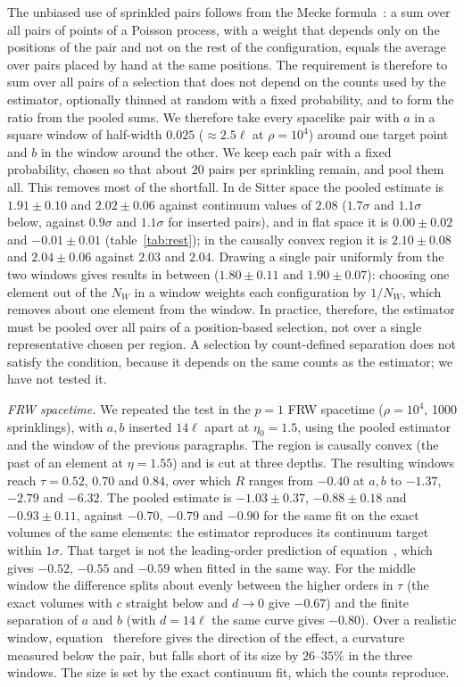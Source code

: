 \documentclass[12pt]{iopart}
\begin{document}
The unbiased use of sprinkled pairs follows from the Mecke formula~\cite{LastPenrose17}: a sum over all pairs of points of a Poisson process, with a weight that depends only on the positions of the pair and not on the rest of the configuration, equals the average over pairs placed by hand at the same positions. The requirement is therefore to sum over all pairs of a selection that does not depend on the counts used by the estimator, optionally thinned at random with a fixed probability, and to form the ratio from the pooled sums. We therefore take every spacelike pair with $a$ in a square window of half-width $0.025$ ($\approx2.5\ell$ at $\rho=10^4$) around one target point and $b$ in the window around the other. We keep each pair with a fixed probability, chosen so that about $20$ pairs per sprinkling remain, and pool them all. This removes most of the shortfall. In de Sitter space the pooled estimate is $1.91\pm0.10$ and $2.02\pm0.06$ against continuum values of $2.08$ ($1.7\sigma$ and $1.1\sigma$ below, against $0.9\sigma$ and $1.1\sigma$ for inserted pairs), and in flat space it is $0.00\pm0.02$ and $-0.01\pm0.01$ (table~\ref{tab:rest}); in the causally convex region it is $2.10\pm0.08$ and $2.04\pm0.06$ against $2.03$ and $2.04$. Drawing a single pair uniformly from the two windows gives results in between ($1.80\pm0.11$ and $1.90\pm0.07$): choosing one element out of the $N_W$ in a window weights each configuration by $1/N_W$, which removes about one element from the window. In practice, therefore, the estimator must be pooled over all pairs of a position-based selection, not over a single representative chosen per region. A selection by count-defined separation does not satisfy the condition, because it depends on the same counts as the estimator; we have not tested it.

\emph{FRW spacetime.} We repeated the test in the $p=1$ FRW spacetime ($\rho=10^4$, 1000 sprinklings), with $a,b$ inserted $14\ell$ apart at $\eta_0=1.5$, using the pooled estimator and the window of the previous paragraphs. The region is causally convex (the past of an element at $\eta=1.55$) and is cut at three depths. The resulting windows reach $\tau=0.52$, $0.70$ and $0.84$, over which $R$ ranges from $-0.40$ at $a,b$ to $-1.37$, $-2.79$ and $-6.32$. The pooled estimate is $-1.03\pm0.37$, $-0.88\pm0.18$ and $-0.93\pm0.11$, against $-0.70$, $-0.79$ and $-0.90$ for the same fit on the exact volumes of the same elements: the estimator reproduces its continuum target within $1\sigma$. That target is not the leading-order prediction of equation~, which gives $-0.52$, $-0.55$ and $-0.59$ when fitted in the same way. For the middle window the difference splits about evenly between the higher orders in $\tau$ (the exact volumes with $c$ straight below and $d\to0$ give $-0.67$) and the finite separation of $a$ and $b$ (with $d=14\ell$ the same curve gives $-0.80$). Over a realistic window, equation~ therefore gives the direction of the effect, a curvature measured below the pair, but falls short of its size by $26$--$35\%$ in the three windows. The size is set by the exact continuum fit, which the counts reproduce.
\end{document}
